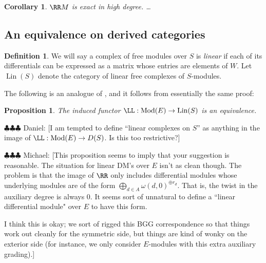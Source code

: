 \documentclass[12pt]{amsart}
\newtheorem{prop}[lemma]{Proposition}
\newtheorem{cor}[lemma]{Corollary}
\theoremstyle{definition}
\newtheorem{defn}[lemma]{Definition}
\theoremstyle{remark}
\newtheorem{rem}[lemma]{Remark}
\newcommand{\daniel}[1]{{\color{blue} \sf $\clubsuit\clubsuit\clubsuit$ Daniel: [#1]}}
\newcommand{\michael}[1]{{\color{red} \sf $\clubsuit\clubsuit\clubsuit$ Michael: [#1]}}
\def\on{\operatorname}
\def\Mod{\operatorname{Mod}}
\def\o{\omega}
\begin{document}
\begin{cor}\label{cor:RM high degree}
$\RR M$ is exact in high degree.  \dots
\end{cor}


\subsection{An equivalence on derived categories}

\begin{defn}
We will say a complex of free modules over $S$  is \emph{linear} if each of its differentials can be expressed as a matrix whose entries are elements of $W$. Let $\on{Lin}(S)$ denote the category of linear free complexes of $S$-modules.
\end{defn}

The following is an analogue of \cite[Proposition 2.1]{EFS}, and it follows from essentially the same proof:

\begin{prop}
The induced functor $\LL :  \Mod(E) \to \on{Lin}(S)$ is an equivalence.
\end{prop}
\daniel{I am tempted to define ``linear complexes on $S$'' as anything in the image of $\LL: \Mod(E)\to D(S)$.  Is this too restrictive?}
\michael{This proposition seems to imply that your suggestion is reasonable. The situation for linear DM's over $E$ isn't as clean though. The problem is that the image of $\RR$ only includes differential modules whose underlying modules are of the form $\bigoplus_{d \in A} \o(d, 0)^{\oplus r_d}$. That is, the twist in the auxiliary degree is always 0. It seems sort of unnatural to define a ``linear differential module" over $E$ to have this form. 

I think this is okay; we sort of rigged this BGG correspondence so that things work out cleanly for the symmetric side, but things are kind of wonky on the exterior side (for instance, we only consider $E$-modules with this extra auxiliary grading).}
\end{document}
